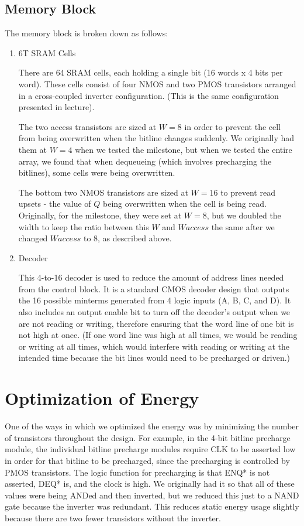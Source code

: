 \documentclass[12pt]{report}
\begin{document}
\subsection*{Memory Block}
The memory block is broken down as follows:
\begin{enumerate}
  \item 6T SRAM Cells

  There are 64 SRAM cells, each holding a single bit (16 words x 4 bits per word). These cells consist of four NMOS and two PMOS transistors arranged in a cross-coupled inverter configuration. (This is the same configuration presented in lecture).

  The two access transistors are sized at $W = 8$ in order to prevent the cell from being overwritten when the bitline changes suddenly. We originally had them at $W = 4$ when we tested the milestone, but when we tested the entire array, we found that when dequeueing (which involves precharging the bitlines), some cells were being overwritten.

  The bottom two NMOS transistors are sized at $W = 16$ to prevent read upsets - the value of $Q$ being overwritten when the cell is being read. Originally, for the milestone, they were set at $W = 8$, but we doubled the width to keep the ratio between this $W$ and $W{access}$ the same after we changed $W{access}$ to 8, as described above.

  \item Decoder

  This 4-to-16 decoder is used to reduce the amount of address lines needed from the control block. It is a standard CMOS decoder design that outputs the 16 possible minterms generated from 4 logic inputs (A, B, C, and D). It also includes an output enable bit to turn off the decoder's output when we are not reading or writing, therefore ensuring that the word line of one bit is not high at once. (If one word line was high at all times, we would be reading or writing at all times, which would interfere with reading or writing at the intended time because the bit lines would need to be precharged or driven.)
\end{enumerate}

\newpage
\section*{Optimization of Energy}
One of the ways in which we optimized the energy was by minimizing the number of transistors throughout the design. For example, in the 4-bit bitline precharge module, the individual bitline precharge modules require CLK to be asserted low in order for that bitline to be precharged, since the precharging is controlled by PMOS transistors. The logic function for precharging is that ENQ* is not asserted, DEQ* is, and the clock is high. We originally had it so that all of these values were being ANDed and then inverted, but we reduced this just to a NAND gate because the inverter was redundant. This reduces static energy usage slightly because there are two fewer transistors without the inverter.
\end{document}

